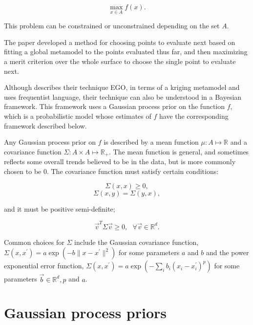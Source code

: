 \documentclass[phd,tocprelim]{cornell}
\begin{document}
\begin{equation}
\max_{x \in A} f(x).
\end{equation}

This problem can be constrained or unconstrained depending on the set $A$.

The paper \cite{Jones1998} developed a method for choosing points to evaluate next based on fitting a global metamodel to the points evaluated thus far, and then maximizing a merit criterion over the whole surface to choose the single point to evaluate next.

Although \cite{Jones1998} describes their technique EGO, in terms of a kriging metamodel and uses frequentist language, their technique can also be understood in a Bayesian framework. This framework uses a Gaussian process prior on the function $f$, which is a probabilistic model whose estimates of $f$ have the corresponding framework described below.

Any Gaussian process prior on $f$ is described by a mean function $\mu : A \mapsto \mathbb{R}$ and a covariance function $\Sigma : A \times A \mapsto \mathbb{R}_{+}$. The mean function is general, and sometimes reflects some overall trends believed to be in the data, but is more commonly chosen to be 0. The covariance function must satisfy certain conditions: 

\begin{equation}\Sigma(x,x) \geq 0,\end{equation}
\begin{equation}\Sigma(x,y) = \Sigma(y,x),\end{equation}

and it must be positive semi-definite;

\begin{equation}\vec{v}^{T}\Sigma \vec{v} \geq 0, \ \ \ \forall \vec{v} \in \mathbb{R}^{d}.\end{equation}

Common choices for $\Sigma$ include the Gaussian covariance function, $\Sigma(x,x^{\prime}) = a \exp(-b \| x - x^{\prime}\|^{2})$ for some parameters $a$ and $b$ and the power exponential error function, $\Sigma(x, x^{\prime}) = a \exp(-\sum_{i} b_{i} (x_{i} - x_{i}^{\prime})^{p})$ for some parameters $\vec{b} \in \mathbb{R}^{d}, p$ and $a$.

\section{Gaussian process priors}
\end{document}
